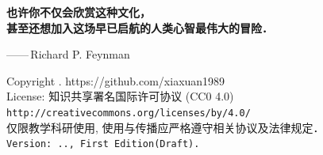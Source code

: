 \thispagestyle{empty} %
\begin{flushleft}
    \vspace*{\fill}
    \textbf{也许你不仅会欣赏这种文化，\\甚至还想加入这场早已启航的人类心智最伟大的冒险．}\\
\end{flushleft}
\begin{flushright}
    ——\,Richard P. Feynman
\end{flushright}
\vspace{\fill}
\begin{flushleft}
    Copyright \textcopyright{} \the\year{}  \bookauthor. \normalsize{https://github.com/xiaxuan1989} \\
    License: 知识共享署名国际许可协议 (CC0 4.0)
    \texttt{http://creativecommons.org/licenses/by/4.0/}\\
    仅限教学科研使用, 使用与传播应严格遵守相关协议及法律规定．\\
    \texttt{Version: \the\year.\the\month.\the\day, First Edition(Draft).}
\end{flushleft}
\addtocounter{page}{2}